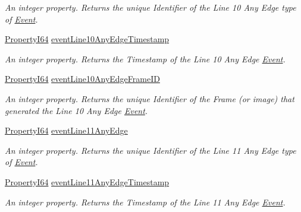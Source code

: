 \begin{DoxyCompactItemize}
\begin{DoxyCompactList}\small\item\em An integer property. Returns the unique Identifier of the Line 10 Any Edge type of \hyperlink{classmv_i_m_p_a_c_t_1_1acquire_1_1_event}{Event}. \end{DoxyCompactList}\item 
\hyperlink{group___common_interface_ga81749b2696755513663492664a18a893}{Property\+I64} \hyperlink{classmv_i_m_p_a_c_t_1_1acquire_1_1_gen_i_cam_1_1_event_control_aded00caef3d6945a7184c37a0cba5fa5}{event\+Line10\+Any\+Edge\+Timestamp}
\begin{DoxyCompactList}\small\item\em An integer property. Returns the Timestamp of the Line 10 Any Edge \hyperlink{classmv_i_m_p_a_c_t_1_1acquire_1_1_event}{Event}. \end{DoxyCompactList}\item 
\hyperlink{group___common_interface_ga81749b2696755513663492664a18a893}{Property\+I64} \hyperlink{classmv_i_m_p_a_c_t_1_1acquire_1_1_gen_i_cam_1_1_event_control_ae0c9ca772b6fcbb377b3ab07d7487559}{event\+Line10\+Any\+Edge\+Frame\+I\+D}
\begin{DoxyCompactList}\small\item\em An integer property. Returns the unique Identifier of the Frame (or image) that generated the Line 10 Any Edge \hyperlink{classmv_i_m_p_a_c_t_1_1acquire_1_1_event}{Event}. \end{DoxyCompactList}\item 
\hyperlink{group___common_interface_ga81749b2696755513663492664a18a893}{Property\+I64} \hyperlink{classmv_i_m_p_a_c_t_1_1acquire_1_1_gen_i_cam_1_1_event_control_abfb82ad34bb2d72b786ed479069a69e2}{event\+Line11\+Any\+Edge}
\begin{DoxyCompactList}\small\item\em An integer property. Returns the unique Identifier of the Line 11 Any Edge type of \hyperlink{classmv_i_m_p_a_c_t_1_1acquire_1_1_event}{Event}. \end{DoxyCompactList}\item 
\hyperlink{group___common_interface_ga81749b2696755513663492664a18a893}{Property\+I64} \hyperlink{classmv_i_m_p_a_c_t_1_1acquire_1_1_gen_i_cam_1_1_event_control_a00e0833d3931d1fe1dac9dacf77a22b1}{event\+Line11\+Any\+Edge\+Timestamp}
\begin{DoxyCompactList}\small\item\em An integer property. Returns the Timestamp of the Line 11 Any Edge \hyperlink{classmv_i_m_p_a_c_t_1_1acquire_1_1_event}{Event}. \end{DoxyCompactList}\item 

\end{DoxyCompactItemize}
